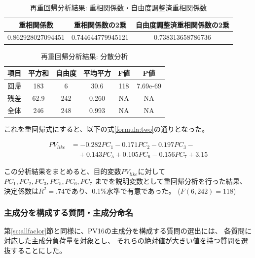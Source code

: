 \documentclass[11pt,a4paper, uplatex]{jsarticle}
\begin{document}
\begin{table}[htbp]
  \begin{center}
    \caption{再重回帰分析結果: 重相関係数・自由度調整済重相関係数}
    \begin{tabular}{c|c|c}
      \hline
      重相関係数 & 重相関係数の2乗 & 自由度調整済重相関係数の2乗 \\ \hline \hline
      0.862928027094451 & 0.744644779945121 & 0.738313658786736
    \end{tabular}
    \label{Rs-new}
  \end{center}
\end{table}

\begin{table}[htbp]
  \begin{center}
    \caption{再重回帰分析結果: 分散分析}
    \begin{tabular}{c|c|c|c|c|c}
      \hline
      項目 & 平方和 & 自由度 & 平均平方 & F値 & P値 \\ \hline \hline
      回帰 & 183 & 6 & 30.6 & 118 & 7.69e-69 \\
      残差 & 62.9 & 242 & 0.260 & NA & NA \\
      全体 & 246 & 248 & 0.993 & NA & NA \\
    \end{tabular}
    \label{annova-new}
  \end{center}
\end{table}

これを重回帰式にすると、以下の式\ref{formula:two}の通りとなった。

\begin{equation}
  \label{formula:two}
  \begin{split}
    PV_{like} &= -0.282PC_1 - 0.171PC_2 - 0.197PC_3 - \\
    &\quad + 0.143PC_5 + 0.105PC_6 - 0.156PC_7 + 3.15
  \end{split}
\end{equation}

この分析結果をまとめると、目的変数$ PV_{like} $に対して
$ PC_1, PC_2, PC_3, PC_5, PC_6, PC_7$
までを説明変数として重回帰分析を行った結果、
決定係数は$ R^2 = .74 $であり、0.1\%水準で有意であった。
($ F(6, 242) = 118 $)

\subsubsection{主成分を構成する質問・主成分命名}
第\ref{sc:allfaclor}節と同様に、PV16の主成分を構成する質問の選出には、
各質問に対応した主成分負荷量を対象とし、
それらの絶対値が大きい値を持つ質問を選抜することにした。
\end{document}
